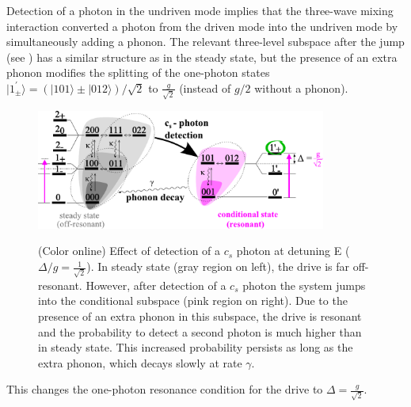 Detection of a photon in the undriven mode
implies that the three-wave mixing interaction
converted a photon from the driven mode into
the undriven mode by simultaneously adding a phonon.
The relevant three-level subspace after the jump 
(see ) has a similar structure as in the steady state, 
but the presence of an extra phonon
modifies the splitting of the one-photon 
states $|1^\prime_{\pm}\rangle=(|101\rangle \pm |012\rangle)/\sqrt{2}$  to
$\frac{g}{\sqrt{2}}$ 
(instead of $g/2$ without a phonon).
%
\begin{figure}[htb]
\centering  
  \includegraphics[width=0.85\textwidth]{./figs_Komar2013/fig7.pdf}\\
  \caption{
  \label{fig:levels_jumps}(Color online)
  Effect of detection of a $c_s$ photon
  at detuning E ($\Delta/g = \frac{1}{\sqrt{2}}$).
  In steady state (gray region on left), 
  the drive is far off-resonant.
  However, after detection of a $c_s$ photon the system
  jumps into the conditional subspace (pink region on right).
  Due to the presence of an extra phonon in this subspace,
  the drive is resonant and the probability to detect a second
  photon is much higher than in steady state.
  This increased probability persists
  as long as the extra phonon,
  which decays slowly at rate $\gamma$.
  }
\end{figure}
This changes
the one-photon resonance condition
for the drive to $\Delta = \frac{g}{\sqrt{2}}$.
